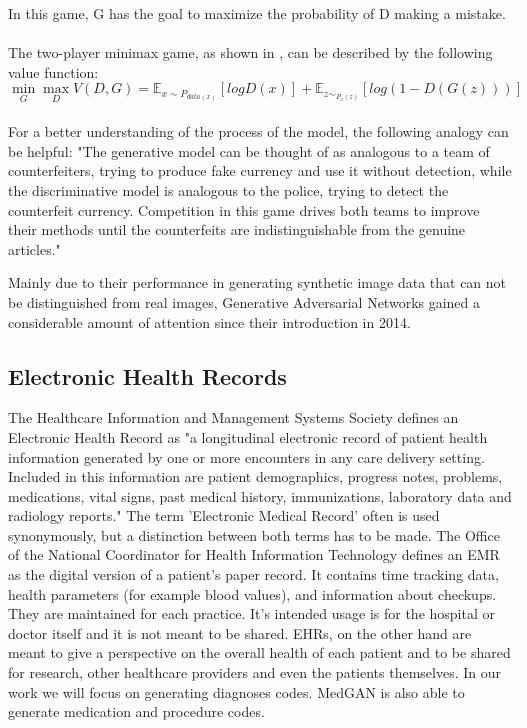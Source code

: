 \documentclass[11pt, a4paper]{book}
\begin{document}
In this game, G has the goal to maximize the probability of D making a mistake.  \cite{goodfellow2014generative}
\\
\\
The two-player minimax game, as shown in \cite{Goodfellow2014}, can be described by the following value function:
\\
\begin{equation}
	\min_G\max_DV(D,G) = \mathbb{E}_{x\sim{P_{data(x)}}}[log D(x)] + \mathbb{E}_{z\sim_{P_z(z)}}[log(1 - D(G(z)))]
\end{equation}
\\

For a better understanding of the process of the model, the following analogy can be helpful:
"The generative model can be thought of as analogous to a team of counterfeiters, trying  to  produce  fake  currency  and  use  it  without  detection,  while  the  discriminative  model  is analogous to the police, trying to detect the counterfeit currency.  Competition in this game drives both teams to improve their methods until the counterfeits are indistinguishable from the genuine articles." \cite{goodfellow2014generative}

Mainly due to their performance in generating synthetic image data that can not be distinguished from real images, Generative Adversarial Networks gained a considerable amount of attention since their introduction in 2014.


\subsection{Electronic Health Records}
The Healthcare Information and Management Systems Society defines an Electronic Health Record as "a longitudinal electronic record of patient health information generated by one or more encounters in any care delivery setting. Included in this information are patient demographics, progress notes, problems, medications, vital signs, past medical history, immunizations, laboratory data and radiology reports." \cite{HIMMS}
The term 'Electronic Medical Record' often is used synonymously, but a distinction between both terms has to be made.
The Office of the National Coordinator for Health Information Technology defines an EMR as the digital version of a patient's paper record. It contains time tracking data, health parameters (for example blood values), and information about checkups. They are maintained for each practice. It's intended usage is for the hospital or doctor itself and it is not meant to be shared. \cite{ONC}
EHRs, on the other hand are meant to give a perspective on the overall health of each patient and to be shared for research, other healthcare providers and even the patients themselves. \cite{ONC}
In our work we will focus on generating diagnoses codes. MedGAN is also able to generate medication and procedure codes.
\end{document}
